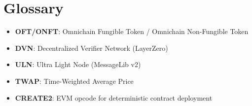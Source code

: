 \documentclass[10pt,a4paper,twocolumn]{article}
\begin{document}
\appendix
\section{Glossary}
\begin{itemize}
  \item \textbf{OFT/ONFT}: Omnichain Fungible Token / Omnichain Non-Fungible Token
  \item \textbf{DVN}: Decentralized Verifier Network (LayerZero)
  \item \textbf{ULN}: Ultra Light Node (MessageLib v2)
  \item \textbf{TWAP}: Time-Weighted Average Price
  \item \textbf{CREATE2}: EVM opcode for deterministic contract deployment
\end{itemize}
\end{document}
